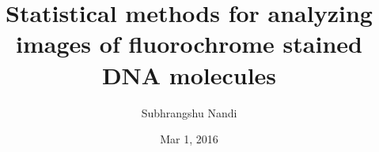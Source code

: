 \documentclass[12pt]{article}
\begin{document}
\title{Statistical methods for analyzing images of fluorochrome stained DNA molecules}
\author{Subhrangshu Nandi}
\date{Mar 1, 2016}

\maketitle




\newpage
\end{document}
